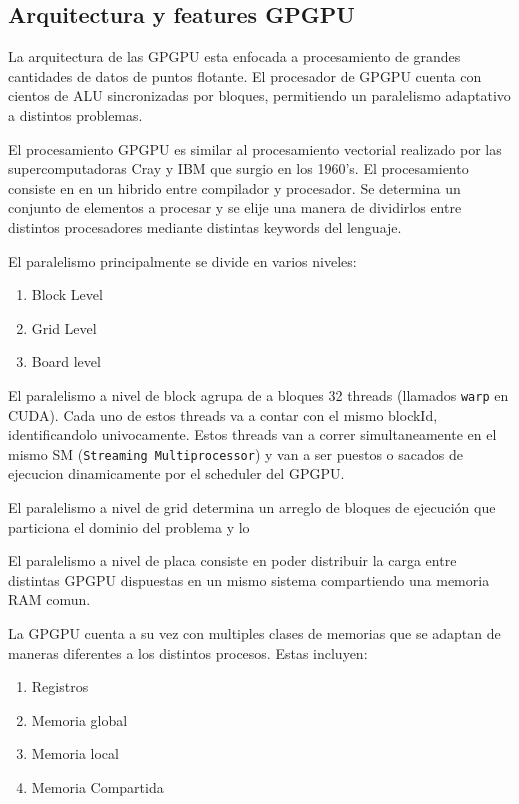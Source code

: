 \subsection{Arquitectura y features GPGPU}

La arquitectura de las GPGPU esta enfocada a procesamiento de grandes cantidades de datos
de puntos flotante. El procesador de GPGPU cuenta con cientos de ALU sincronizadas
por bloques, permitiendo un paralelismo adaptativo a distintos problemas.

El procesamiento GPGPU es similar al procesamiento vectorial
realizado por las supercomputadoras Cray y IBM que surgio en los 1960's.
El procesamiento consiste en en un hibrido entre compilador y procesador. Se determina
un conjunto de elementos a procesar y se elije una manera de dividirlos entre distintos
procesadores mediante distintas keywords del lenguaje.

El paralelismo principalmente se divide en varios niveles:
\begin{enumerate}
  \item Block Level
  \item Grid Level
  \item Board level
\end{enumerate}

El paralelismo a nivel de block agrupa de a bloques 32 threads (llamados \texttt{warp} en CUDA).
Cada uno de estos threads va a contar con el mismo blockId, identificandolo univocamente.
Estos threads van a correr simultaneamente en el mismo SM (\texttt{Streaming Multiprocessor}) y
van a ser puestos o sacados de ejecucion dinamicamente por el scheduler del GPGPU.

El paralelismo a nivel de grid determina un arreglo de bloques de ejecuci\'on que particiona
el dominio del problema y lo

El paralelismo a nivel de placa consiste en poder distribuir la carga entre distintas
GPGPU dispuestas en un mismo sistema compartiendo una memoria RAM comun.

La GPGPU cuenta a su vez con multiples clases de memorias que se adaptan de maneras
diferentes a los distintos procesos. Estas incluyen:

\begin{enumerate}
  \item Registros
  \item Memoria global
  \item Memoria local
  \item Memoria Compartida
\end{enumerate}

